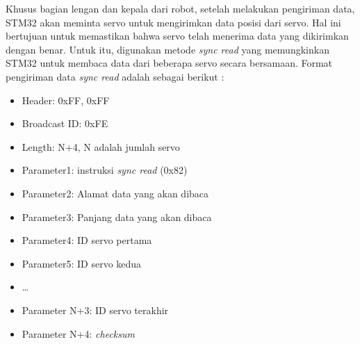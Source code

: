 Khusus bagian lengan dan kepala dari robot, setelah melakukan pengiriman data, STM32 akan
meminta servo untuk mengirimkan data posisi dari servo. Hal ini bertujuan 
untuk memastikan bahwa servo telah menerima data yang dikirimkan dengan benar.
Untuk itu, digunakan metode \emph{sync read} yang memungkinkan STM32 untuk
membaca data dari beberapa servo secara bersamaan. Format pengiriman data
\emph{sync read} adalah sebagai berikut :
\begin{itemize}
    \item Header: 0xFF, 0xFF
    \item Broadcast ID: 0xFE
    \item Length: N+4, N adalah jumlah servo
    \item Parameter1: instruksi \emph{sync read} (0x82)
    \item Parameter2: Alamat data yang akan dibaca
    \item Parameter3: Panjang data yang akan dibaca
    \item Parameter4: ID servo pertama
    \item Parameter5: ID servo kedua
    \item \dots
    \item Parameter N+3: ID servo terakhir
    \item Parameter N+4: \emph{checksum}
\end{itemize}

